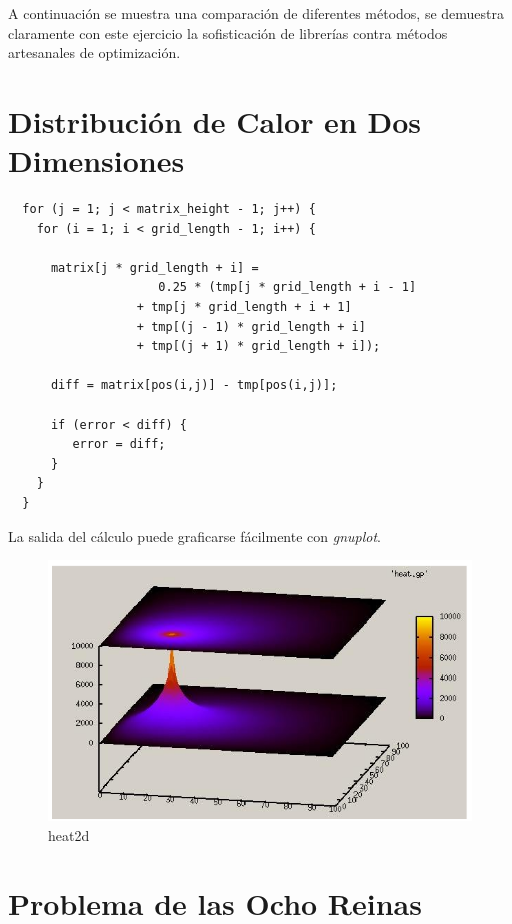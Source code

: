 \documentclass[a4paper]{report}
\begin{document}
\bigskip

A continuaci\'on se muestra una comparaci\'on de diferentes m\'etodos, se
demuestra claramente con este ejercicio la sofisticaci\'on de librer\'ias
contra m\'etodos artesanales de optimizaci\'on.

\section{Distribuci\'on de Calor en Dos Dimensiones}

\begin{verbatim}
  for (j = 1; j < matrix_height - 1; j++) {
    for (i = 1; i < grid_length - 1; i++) {
      
      matrix[j * grid_length + i] = 
                     0.25 * (tmp[j * grid_length + i - 1]
                  + tmp[j * grid_length + i + 1]
                  + tmp[(j - 1) * grid_length + i]
                  + tmp[(j + 1) * grid_length + i]);

      diff = matrix[pos(i,j)] - tmp[pos(i,j)];

      if (error < diff) {
         error = diff;
      }
    }
  }
\end{verbatim}

La salida del c\'alculo puede graficarse f\'acilmente con {\it gnuplot}.

\begin{figure}[H]
\begin{center}
\includegraphics[width=12cm]{heat2d.png}
\caption{heat2d}
\end{center}
\end{figure}

\section{Problema de las Ocho Reinas}
\end{document}
